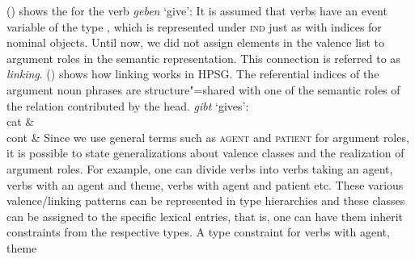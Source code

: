 () shows the \contv for the verb \emph{geben} `give':
\ea
\label{mrs-geben}
\z
It is assumed that verbs have an event variable of the type , which is represented under \textsc{ind} just as with indices for nominal objects.
Until now, we did not assign elements in the valence list to argument roles in the semantic representation. This connection is referred to
as \emph{linking}. () shows how linking works in HPSG. The referential indices of the argument
noun phrases are structure"=shared with one of the semantic roles of the relation contributed by the
head.
\eas
\label{le-geben}
\emph{gibt} `gives':\\
\ms
{ cat &  \\
  cont &  
}
\zs
Since we use general terms such as \textsc{agent} and \textsc{patient} for argument roles, it is possible to state generalizations about valence classes and
the realization of argument roles. For example, one can divide verbs into verbs taking an agent, verbs with an agent and theme, verbs with agent and patient etc.
These various valence/linking patterns can be represented in type hierarchies and
these classes can be assigned to the specific lexical entries, that is, one can have them inherit
constraints from the respective types. A type constraint for verbs with agent, theme
